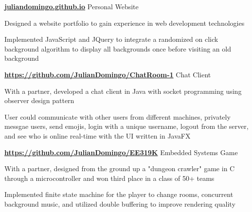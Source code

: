 \begin{cventries}
  \cventry
    {\normalsize \textbf{\url{juliandomingo.github.io}}}
    {\large Personal Website}
    {}
    {}
    {
      \begin{cvitems}
        \item {\normalsize Designed a website portfolio to gain experience in web development technologies}
        \item {\normalsize Implemented JavaScript and JQuery to integrate a randomized on click background algorithm to display all backgrounds once before visiting an old background}
      \end{cvitems}
    }
  \cventry
    {\normalsize \textbf{\url{https://github.com/JulianDomingo/ChatRoom-1}}}
    {\large Chat Client}
    {}
    {}
    {
      \begin{cvitems}
        \item {\normalsize With a partner, developed a chat client in Java with socket programming using observer design pattern}
        \item {\normalsize User could communicate with other users from different machines, privately messgae users, send emojis, login with a unique username, logout from the server, and see who is online real-time with the UI written in JavaFX}
      \end{cvitems}
    }
  \cventry
    {\normalsize \textbf{\url{https://github.com/JulianDomingo/EE319K}}}
    {\large Embedded Systems Game}
    {}
    {}
    {
      \begin{cvitems}
        \item {\normalsize With a partner, designed from the ground up a "dungeon crawler" game in C through a microcontroller and won third place in a class of 50+ teams}
        \item {\normalsize Implemented finite state machine for the player to change rooms, concurrent background music, and utilized double buffering to improve rendering quality}
      \end{cvitems}
    }
\end{cventries}
